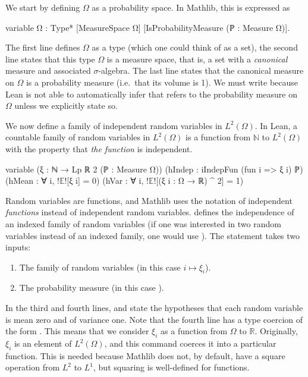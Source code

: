\documentclass[11pt]{amsart}
\numberwithin{equation}{section}
\theoremstyle{definition}
\theoremstyle{remark}
\begin{document}
We start by defining $\Omega$ as a probability space. In Mathlib, this is expressed as
\begin{leancode}
variable {Ω : Type*} 
         [MeasureSpace Ω] 
         [IsProbabilityMeasure (ℙ : Measure Ω)].
\end{leancode}
The first line defines $\Omega$ as a type (which one could think of as a set), the second line states that this type $\Omega$ is a measure space, that is, a set with a \textit{canonical} measure  and associated $\sigma$-algebra. The last line states that the canonical measure  on $\Omega$ is a probability measure (i.e.~that its volume is 1). We must write  because Lean is not able to automatically infer that  refers to the probability measure on $\Omega$ unless we explicitly state so.

We now define a family of independent random variables in $L^2(\Omega)$. In Lean, a countable family of random variables in $L^2(\Omega)$ is a function from $\mathbb N$ to $L^2(\Omega)$ with the property that \emph{the function} is independent.
\begin{leancode}
variable (ξ : ℕ → Lp ℝ 2 (ℙ : Measure Ω))
         (hIndep : iIndepFun (fun i => ξ i) ℙ)
         (hMean : ∀ i, !$\mathbb E$![ξ i] = 0)
         (hVar : ∀ i, !$\mathbb E$![(ξ i : Ω → ℝ) ^ 2] = 1)
\end{leancode}
Random variables are functions, and Mathlib uses the notation of independent \emph{functions} instead of independent random variables.  defines the independence of an indexed family of random variables (if one was interested in two random variables instead of an indexed family, one would use ). The  statement takes two inputs:
    \begin{enumerate}
        \item The family of random variables (in this case $i\mapsto \xi_i$).
        \item The probability measure (in this case ).
    \end{enumerate}
  In the third and fourth lines,  and  state the hypotheses that each random variable is mean zero and of variance one. 
Note that the fourth line has a type coercion of the form . This means that we consider $\xi_i$ as a function from $\Omega$ to $\mathbb R$. Originally, $\xi_i$ is an element of $L^2(\Omega)$, and this command coerces it into a particular function. This is needed because Mathlib does not, by default, have a square operation from $L^2$ to $L^1$, but squaring is well-defined for functions.
\end{document}
